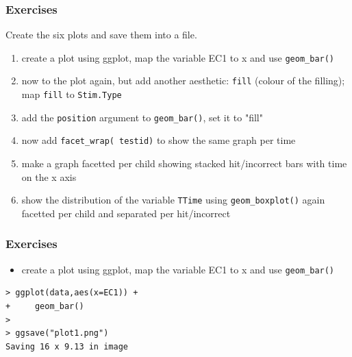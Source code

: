 \documentclass[xcolor={table},c]{beamer}
\begin{document}
\begin{frame}[fragile]\frametitle{Exercises}
Create the six plots and save them into a file.
  \begin{enumerate}
  \item create a plot using ggplot, map the variable EC1 to x and use \texttt{geom\_bar()}
  \item now to the plot again, but add another aesthetic: \texttt{fill} (colour of the filling); map \texttt{fill} to \texttt{Stim.Type}
  \item add the \texttt{position} argument to \texttt{geom\_bar()}, set it to "fill"
  \item now add \texttt{facet\_wrap(~testid)} to show the same graph per time
  \item make a graph facetted per child showing stacked hit/incorrect bars with time on the x axis
  \item show the distribution of the variable \texttt{TTime} using \texttt{geom\_boxplot()} again facetted per child and separated per hit/incorrect
  \end{enumerate}
\end{frame}


\begin{frame}[fragile]\frametitle{Exercises}
  \begin{itemize}
  \item create a plot using ggplot, map the variable EC1 to x and use \texttt{geom\_bar()}
  \end{itemize}
\begin{verbatim}
> ggplot(data,aes(x=EC1)) +
+     geom_bar()
> 
> ggsave("plot1.png")
Saving 16 x 9.13 in image  
\end{verbatim}
\begin{center}
\end{center}
\end{frame}
\end{document}
